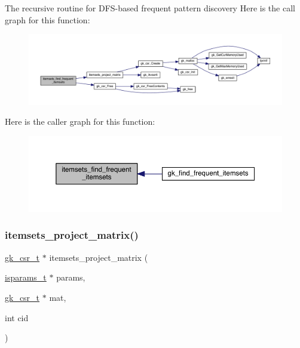 The recursive routine for D\+F\+S-\/based frequent pattern discovery Here is the call graph for this function\+:\nopagebreak
\begin{figure}[H]
\begin{center}
\leavevmode
\includegraphics[width=350pt]{a00104_ab19ae99e1e3ba575373cf0fe846a8cd9_cgraph}
\end{center}
\end{figure}
Here is the caller graph for this function\+:\nopagebreak
\begin{figure}[H]
\begin{center}
\leavevmode
\includegraphics[width=350pt]{a00104_ab19ae99e1e3ba575373cf0fe846a8cd9_icgraph}
\end{center}
\end{figure}
\mbox{\label{a00104_ab348ad8f89d70692400d7602e3a824bf}} 
\subsubsection{\texorpdfstring{itemsets\+\_\+project\+\_\+matrix()}{itemsets\_project\_matrix()}}
{\footnotesize\ttfamily \hyperlink{a00634}{gk\+\_\+csr\+\_\+t} $\ast$ itemsets\+\_\+project\+\_\+matrix (\begin{DoxyParamCaption}\item[{\hyperlink{a00698}{isparams\+\_\+t} $\ast$}]{params,  }\item[{\hyperlink{a00634}{gk\+\_\+csr\+\_\+t} $\ast$}]{mat,  }\item[{int}]{cid }\end{DoxyParamCaption})}


